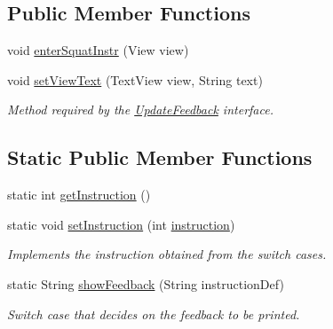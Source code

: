 \subsection*{Public Member Functions}
\begin{DoxyCompactItemize}
\item 
void \mbox{\hyperlink{classcom_1_1example_1_1trainawearapplication_1_1_classic_squat_af11bf43a5c57edf97320d8662fc343a1}{enter\+Squat\+Instr}} (View view)
\item 
void \mbox{\hyperlink{classcom_1_1example_1_1trainawearapplication_1_1_classic_squat_ab193e39e2f1255fd88d0508cfe7a63ff}{set\+View\+Text}} (Text\+View view, String text)
\begin{DoxyCompactList}\small\item\em Method required by the \mbox{\hyperlink{interfacecom_1_1example_1_1trainawearapplication_1_1_update_feedback}{Update\+Feedback}} interface. \end{DoxyCompactList}\end{DoxyCompactItemize}
\subsection*{Static Public Member Functions}
\begin{DoxyCompactItemize}
\item 
static int \mbox{\hyperlink{classcom_1_1example_1_1trainawearapplication_1_1_classic_squat_ab2575cf1007e1d844a98e511b93aaf8d}{get\+Instruction}} ()
\item 
static void \mbox{\hyperlink{classcom_1_1example_1_1trainawearapplication_1_1_classic_squat_a3a096fd4064cf28568fd13336c77d28f}{set\+Instruction}} (int \mbox{\hyperlink{classcom_1_1example_1_1trainawearapplication_1_1_classic_squat_a3cbf1db0a5560d931ebdaa407a1a6285}{instruction}})
\begin{DoxyCompactList}\small\item\em Implements the instruction obtained from the switch cases. \end{DoxyCompactList}\item 
static String \mbox{\hyperlink{classcom_1_1example_1_1trainawearapplication_1_1_classic_squat_a1904cfcfcc9d0e3f1256202a8f7ad33e}{show\+Feedback}} (String instruction\+Def)
\begin{DoxyCompactList}\small\item\em Switch case that decides on the feedback to be printed. \end{DoxyCompactList}\end{DoxyCompactItemize}
